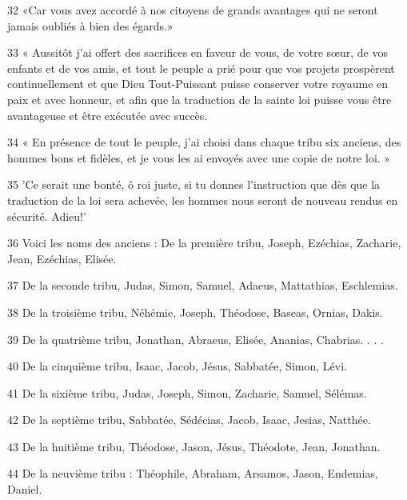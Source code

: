 \par 32 «Car vous avez accordé à nos citoyens de grands avantages qui ne seront jamais oubliés à bien des égards.»

\par 33 « Aussitôt j'ai offert des sacrifices en faveur de vous, de votre sœur, de vos enfants et de vos amis, et tout le peuple a prié pour que vos projets prospèrent continuellement et que Dieu Tout-Puissant puisse conserver votre royaume en paix et avec honneur, et afin que la traduction de la sainte loi puisse vous être avantageuse et être exécutée avec succès.

\par 34 « En présence de tout le peuple, j'ai choisi dans chaque tribu six anciens, des hommes bons et fidèles, et je vous les ai envoyés avec une copie de notre loi. »

\par 35 'Ce serait une bonté, ô roi juste, si tu donnes l'instruction que dès que la traduction de la loi sera achevée, les hommes nous seront de nouveau rendus en sécurité. Adieu!'

\par 36 Voici les noms des anciens : De la première tribu, Joseph, Ezéchias, Zacharie, Jean, Ezéchias, Elisée.

\par 37 De la seconde tribu, Judas, Simon, Samuel, Adaeus, Mattathias, Eschlemias.

\par 38 De la troisième tribu, Néhémie, Joseph, Théodose, Baseas, Ornias, Dakis.

\par 39 De la quatrième tribu, Jonathan, Abraeus, Elisée, Ananias, Chabrias. . . .

\par 40 De la cinquième tribu, Isaac, Jacob, Jésus, Sabbatée, Simon, Lévi.

\par 41 De la sixième tribu, Judas, Joseph, Simon, Zacharie, Samuel, Sélémas.

\par 42 De la septième tribu, Sabbatée, Sédécias, Jacob, Isaac, Jesias, Natthée.

\par 43 De la huitième tribu, Théodose, Jason, Jésus, Théodote, Jean, Jonathan.

\par 44 De la neuvième tribu : Théophile, Abraham, Arsamos, Jason, Endemias, Daniel.

